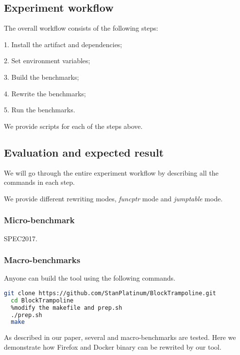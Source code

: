 \documentclass{sigplanconf}
\begin{document}
{%
\subsection{Experiment workflow}

The overall workflow consists of the following steps:

1. Install the artifact and dependencies;

2. Set environment variables;

3. Build the benchmarks;

4. Rewrite the benchmarks;

5. Run the benchmarks.

We provide scripts for each of the steps above.

\subsection{Evaluation and expected result}


We will go through the entire experiment workflow by describing all the commands in each step.

We provide different rewriting modes, \textit{funcptr} mode and \textit{jumptable} mode.






\subsubsection{Micro-benchmark}

SPEC2017.

\subsubsection{Macro-benchmarks}


Anyone can build the tool using the following commands.

\begin{lstlisting}[language=bash]
  git clone https://github.com/StanPlatinum/BlockTrampoline.git
  cd BlockTrampoline
  %modify the makefile and prep.sh 
  ./prep.sh
  make
\end{lstlisting}


As described in our paper, several and macro-benchmarks are tested. Here we demonstrate how Firefox and Docker binary can be rewrited by our tool.

}
\end{document}
